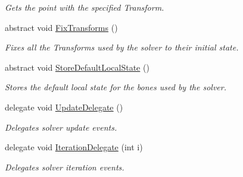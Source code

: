 \begin{DoxyCompactItemize}
\begin{DoxyCompactList}\small\item\em Gets the point with the specified Transform. \end{DoxyCompactList}\item 
abstract void \mbox{\hyperlink{class_root_motion_1_1_final_i_k_1_1_i_k_solver_a266ec32ebdd83faaf37abc41718061b7}{Fix\+Transforms}} ()
\begin{DoxyCompactList}\small\item\em Fixes all the Transforms used by the solver to their initial state. \end{DoxyCompactList}\item 
abstract void \mbox{\hyperlink{class_root_motion_1_1_final_i_k_1_1_i_k_solver_a5009a12837b12c96fed91bc6dc0bd4b6}{Store\+Default\+Local\+State}} ()
\begin{DoxyCompactList}\small\item\em Stores the default local state for the bones used by the solver. \end{DoxyCompactList}\item 
delegate void \mbox{\hyperlink{class_root_motion_1_1_final_i_k_1_1_i_k_solver_a237d83c7b9c6eace8a21aa5821f0a671}{Update\+Delegate}} ()
\begin{DoxyCompactList}\small\item\em Delegates solver update events. \end{DoxyCompactList}\item 
delegate void \mbox{\hyperlink{class_root_motion_1_1_final_i_k_1_1_i_k_solver_ae3da6a8ccd8224ce56d15c4da5cd1ef7}{Iteration\+Delegate}} (int i)
\begin{DoxyCompactList}\small\item\em Delegates solver iteration events. \end{DoxyCompactList}\end{DoxyCompactItemize}
